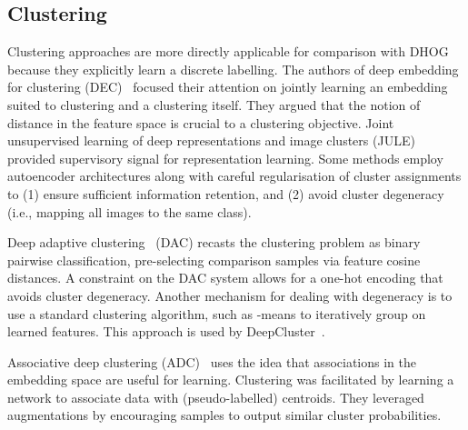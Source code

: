 \documentclass[runningheads]{llncs}
\begin{document}
\subsection{Clustering}
Clustering approaches are more directly applicable for comparison with DHOG because they explicitly learn a discrete labelling. The authors of deep embedding for clustering (DEC)~\cite{xie2016unsupervised} focused their attention on jointly learning an embedding suited to clustering and a clustering itself. They argued that the notion of distance in the feature space is crucial to a clustering objective. Joint unsupervised learning of deep representations and image clusters (JULE)~\cite{yang2016joint} provided supervisory signal for representation learning. Some methods \cite{ghasedi2017deep,fard2018deep} employ autoencoder architectures along with careful regularisation of cluster assignments to (1) ensure sufficient information retention, and (2) avoid cluster degeneracy (i.e., mapping all images to the same class). 

Deep adaptive clustering~\cite{chang2017deep} (DAC) recasts the clustering problem as binary pairwise classification, pre-selecting comparison samples via feature cosine distances. A constraint on the DAC system allows for a one-hot encoding that avoids cluster degeneracy. Another mechanism for dealing with degeneracy is to use a standard clustering algorithm, such as -means to iteratively group on learned features. This approach is used by DeepCluster~\cite{caron2018deep}. 

Associative deep clustering (ADC)~\cite{haeusser2018associative} uses the idea that associations in the embedding space are useful for learning. Clustering was facilitated by learning a network to associate data with (pseudo-labelled) centroids. They leveraged augmentations by encouraging samples to output similar cluster probabilities. 
\end{document}
